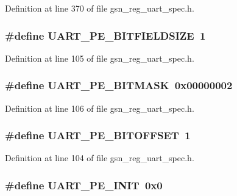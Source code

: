 Definition at line 370 of file gsn\_\-reg\_\-uart\_\-spec.h.

\hypertarget{a00575_ac71207aaafdfaaa4e6c8484c6320bda1}{
\subsubsection[{UART\_\-PE\_\-BITFIELDSIZE}]{\setlength{\rightskip}{0pt plus 5cm}\#define UART\_\-PE\_\-BITFIELDSIZE~1}}
\label{a00575_ac71207aaafdfaaa4e6c8484c6320bda1}


Definition at line 105 of file gsn\_\-reg\_\-uart\_\-spec.h.

\hypertarget{a00575_ad6e3c7e74159b32c86705409f0acece3}{
\subsubsection[{UART\_\-PE\_\-BITMASK}]{\setlength{\rightskip}{0pt plus 5cm}\#define UART\_\-PE\_\-BITMASK~0x00000002}}
\label{a00575_ad6e3c7e74159b32c86705409f0acece3}


Definition at line 106 of file gsn\_\-reg\_\-uart\_\-spec.h.

\hypertarget{a00575_ad425d1d465e435f6c490132db3af8be2}{
\subsubsection[{UART\_\-PE\_\-BITOFFSET}]{\setlength{\rightskip}{0pt plus 5cm}\#define UART\_\-PE\_\-BITOFFSET~1}}
\label{a00575_ad425d1d465e435f6c490132db3af8be2}


Definition at line 104 of file gsn\_\-reg\_\-uart\_\-spec.h.

\hypertarget{a00575_adaf7a118b554387f6517b4c7eb777ac8}{
\subsubsection[{UART\_\-PE\_\-INIT}]{\setlength{\rightskip}{0pt plus 5cm}\#define UART\_\-PE\_\-INIT~0x0}}
\label{a00575_adaf7a118b554387f6517b4c7eb777ac8}


